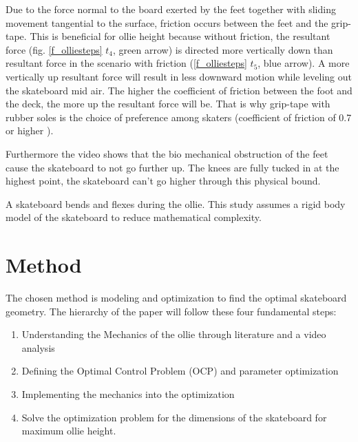\documentclass[default,iicol]{sn-jnl}
\begin{document}
Due to the force normal to the board exerted by the feet together with sliding
movement tangential to the surface, friction occurs between the feet and the
grip-tape. This is beneficial for ollie height because without friction, the
resultant force (fig. \ref{f_olliesteps} $t_4$, green arrow) is directed more
vertically down than resultant force in the scenario with friction
(\ref{f_olliesteps} $t_5$, blue arrow). A more vertically up resultant force
will result in less downward motion while leveling out the skateboard mid air.
The higher the coefficient of friction between the foot and the deck, the more
up the resultant force will be. That is why grip-tape with rubber soles is the
choice of preference among skaters (coefficient of friction of 0.7 or higher
\cite{bron_nog_nodate}).

Furthermore the video shows that the bio mechanical obstruction of the feet
cause the skateboard to not go further up. The knees are fully tucked in at the
highest point, the skateboard can't go higher through this physical bound.

A skateboard bends and flexes during the ollie. This study assumes a rigid body
model of the skateboard to reduce mathematical complexity.

\section{Method}

The chosen method is modeling and optimization to find the optimal skateboard geometry. The hierarchy of the paper will follow these four fundamental steps: 
\begin{enumerate}
    \item Understanding the Mechanics of the ollie through literature and a video analysis
    \item Defining the Optimal Control Problem (OCP) and parameter optimization
    \item Implementing the mechanics into the optimization
    \item Solve the optimization problem for the dimensions of the skateboard for maximum ollie height. 
\end{enumerate}
\end{document}
